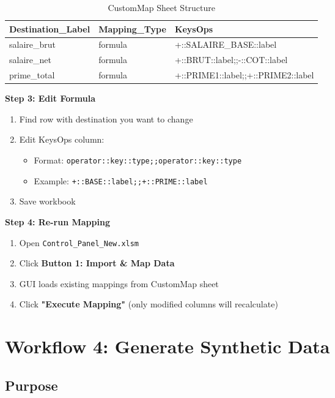 \begin{table}[H]
\centering
\footnotesize
\begin{tabular}{|l|l|l|}
\hline
\textbf{Destination\_Label} & \textbf{Mapping\_Type} & \textbf{KeysOps} \\
\hline
salaire\_brut & formula & +::SALAIRE\_BASE::label \\
salaire\_net & formula & +::BRUT::label;;-::COT::label \\
prime\_total & formula & +::PRIME1::label;;+::PRIME2::label \\
\hline
\end{tabular}
\caption{CustomMap Sheet Structure}
\end{table}

\textbf{Step 3: Edit Formula}

\begin{enumerate}
    \item Find row with destination you want to change
    \item Edit KeysOps column:
    \begin{itemize}
        \item Format: \texttt{operator::key::type;;operator::key::type}
        \item Example: \texttt{+::BASE::label;;+::PRIME::label}
    \end{itemize}
    \item Save workbook
\end{enumerate}

\textbf{Step 4: Re-run Mapping}

\begin{enumerate}
    \item Open \texttt{Control\_Panel\_New.xlsm}
    \item Click \textbf{Button 1: Import \& Map Data}
    \item GUI loads existing mappings from CustomMap sheet
    \item Click \textbf{"Execute Mapping"} (only modified columns will recalculate)
\end{enumerate}

\section{Workflow 4: Generate Synthetic Data}

\subsection{Purpose}

